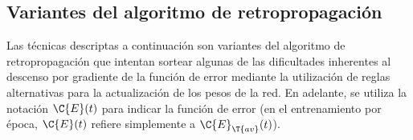 %
\subsection{Variantes del algoritmo de retropropagación}
%
Las técnicas descriptas a continuación son variantes del algoritmo de
retropropagación que intentan sortear algunas de las dificultades
inherentes al descenso por gradiente de la función de error mediante
la utilización de reglas alternativas para la actualización de los
pesos de la red.
En adelante, se utiliza la notación $\C{E}(t)$ para indicar la función
de error (en el entrenamiento por época, $\C{E}(t)$ refiere
simplemente a $\C{E}_{\T{av}}(t)$).
